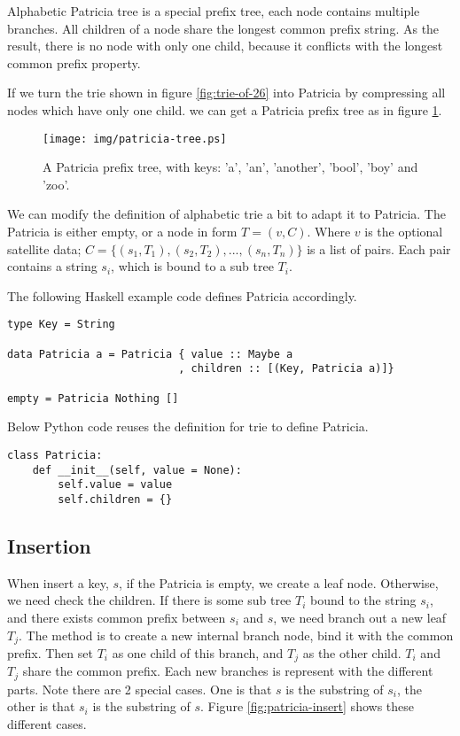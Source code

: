 \documentclass{article}
\begin{document}
Alphabetic Patricia tree is a special prefix tree, each node contains
multiple branches. All children of a node share the longest common
prefix string. As the result, there is no node with only one child,
because it conflicts with the longest common prefix property.

If we turn the trie shown in figure \ref{fig:trie-of-26} into Patricia
by compressing all nodes which have only one child. we can get
a Patricia prefix tree as in figure \ref{fig:patricia-tree}.

\begin{figure}[htbp]
  \centering
  \texttt{[image: img/patricia-tree.ps]}
  \caption{A Patricia prefix tree, with keys: 'a', 'an', 'another', 'bool',
    'boy' and 'zoo'.}
  \label{fig:patricia-tree}
\end{figure}

We can modify the definition of alphabetic trie a bit to adapt it
to Patricia. The Patricia is either empty, or a node in form $T = (v, C)$.
Where $v$ is the optional satellite data; $C = \{(s_1, T_1), (s_2, T_2), ..., (s_n, T_n)\}$
is a list of pairs. Each pair contains a string $s_i$, which is bound
to a sub tree $T_i$.

The following Haskell example code defines Patricia accordingly.

\lstset{language=Haskell}
\begin{lstlisting}
type Key = String

data Patricia a = Patricia { value :: Maybe a
                           , children :: [(Key, Patricia a)]}

empty = Patricia Nothing []
\end{lstlisting}

Below Python code reuses the definition for trie to define Patricia.

\lstset{language=Python}
\begin{lstlisting}
class Patricia:
    def __init__(self, value = None):
        self.value = value
        self.children = {}
\end{lstlisting}

\subsection{Insertion}

When insert a key, $s$, if the Patricia is empty, we
create a leaf node. Otherwise, we need check the children.
If there is some sub tree $T_i$ bound to the string $s_i$,
and there exists common prefix between $s_i$ and $s$, we
need branch out a new leaf $T_j$. The method is to
create a new internal branch node, bind it with the common
prefix. Then set $T_i$ as one child of this branch, and
$T_j$ as the other child. $T_i$ and $T_j$ share the common
prefix. Each new
branches is represent with the different parts. Note there are 2 special
cases. One is that $s$ is the substring of $s_i$, the other is that $s_i$
is the substring of $s$. Figure \ref{fig:patricia-insert} shows these
different cases.
\end{document}
